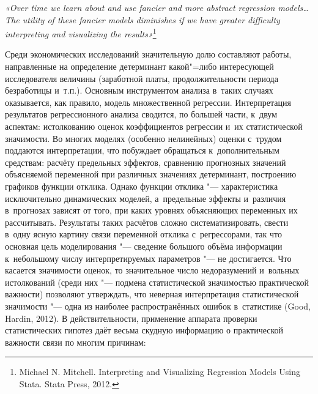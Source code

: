 \documentclass[11pt]{article}
\begin{document}
\setcounter{page}{15}

		
		
\DoFirstPageTechnicalStuff
		
\begin{abstract}

\end{abstract}
		
\begin{keyword}

\end{keyword}
 


{\it «Over time we learn about and use fancier and more abstract regression models… The utility of these fancier models diminishes if we have greater difficulty interpreting and visualizing the results»}\footnote{Michael N. Mitchell. Interpreting and Visualizing Regression Models Using Stata. Stata Press, 2012.}

\bigskip
Среди экономических исследований значительную долю составляют работы, направленные на определение детерминант какой"=либо интересующей исследователя величины (заработной платы, продолжительности периода безработицы и~т.п.). Основным инструментом анализа в~таких случаях оказывается, как правило, модель множественной регрессии. Интерпретация результатов регрессионного анализа сводится, по большей части, к~двум аспектам: истолкованию оценок коэффициентов регрессии и~их статистической значимости. Во многих моделях (особенно нелинейных) оценки с~трудом поддаются интерпретации, что побуждает обращаться к~дополнительным средствам: расчёту предельных эффектов, сравнению прогнозных значений объясняемой переменной при различных значениях детерминант, построению графиков функции отклика. Однако функции отклика "--- характеристика исключительно динамических моделей, а~предельные эффекты и~различия в~прогнозах зависят от того, при каких уровнях объясняющих переменных их рассчитывать. Результаты таких расчётов сложно систематизировать, свести в~одну ясную картину связи переменной отклика с~регрессорами, так что основная цель моделирования "--- сведение большого объёма информации к~небольшому числу интерпретируемых параметров "--- не достигается. Что касается значимости оценок, то значительное число недоразумений и~вольных истолкований (среди них "--- подмена статистической значимостью практической важности) позволяют утверждать, что неверная интерпретация статистической значимости "--- одна из наиболее распространённых ошибок в~статистике (Good, Hardin, 2012). В действительности, применение аппарата проверки статистических гипотез даёт весьма скудную информацию о практической важности связи по многим причинам: 
\end{document}
